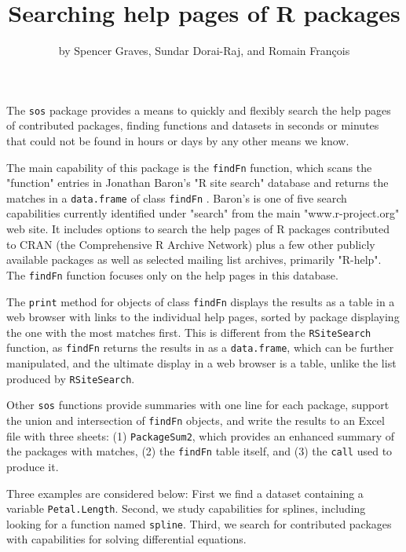\title{Searching help pages of R packages}
\author{by Spencer Graves, Sundar Dorai-Raj, and Romain Fran{\c c}ois}

\maketitle

The {\tt sos} package provides a means to quickly and flexibly
search the help pages of contributed packages, finding
functions and datasets in seconds or minutes that could not be
found in hours or days by any other means we know.

The main capability of this package is the {\tt findFn} function, which scans the "function" entries in Jonathan Baron's "R site search"
database and returns the matches in a {\tt data.frame} of class
{\tt findFn} \citep{JB09URL}.  Baron's is one of five
search capabilities currently identified under "search" from the main "www.r-project.org" web site.  It includes options to
search the help pages of R packages contributed to CRAN (the
Comprehensive R Archive Network) plus a few other publicly
available packages as well as selected mailing list archives,
primarily "R-help".  The {\tt findFn} function focuses only
on the help pages in this database.

The {\tt print} method for objects of class {\tt findFn}
displays the results as a table in a web
browser with links to the individual help pages, sorted by package
displaying the one with the most matches first.  This is different
from the {\tt RSiteSearch} function, as {\tt findFn} returns
the results in \R{} as a {\tt data.frame}, which can be further
manipulated, and the ultimate display in a web browser is a
table, unlike the list produced by {\tt RSiteSearch}.

Other {\tt sos} functions provide summaries with one line for each
package, support the union and intersection of {\tt findFn} objects,
and write the results to an Excel file with three sheets:  (1)
{\tt PackageSum2}, which provides an enhanced summary of the packages
with matches, (2) the {\tt findFn} table itself, and (3) the {\tt call}
used to produce it.

Three examples are considered below:  First we find a dataset
containing a variable {\tt Petal.Length}. Second, we study
\R{} capabilities for splines, including looking for a function
named {\tt spline}.  Third, we search for contributed \R{} packages
 with capabilities for solving differential equations.

